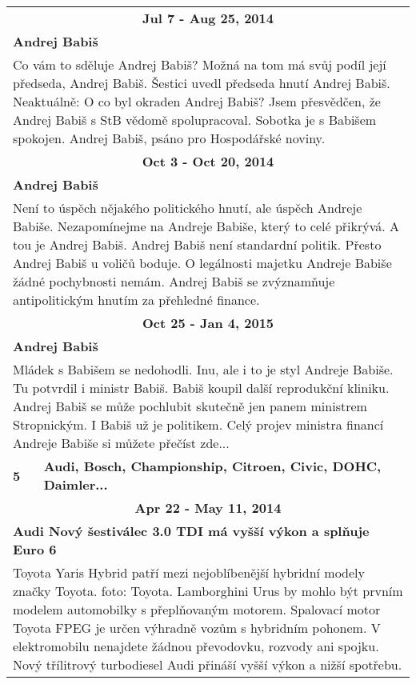 \begin{tabularx}{\linewidth}{l l}
                \multicolumn{2}{c}{\bf Jul 7 - Aug 25, 2014} \\
                \multicolumn{2}{p{\linewidth}}{\bf Andrej Babiš} \\
                \multicolumn{2}{p{\linewidth}}{Co vám to sděluje Andrej Babiš? Možná na tom má svůj podíl její předseda, Andrej Babiš. Šestici uvedl předseda hnutí Andrej Babiš. Neaktuálně: O co byl okraden Andrej Babiš? Jsem přesvědčen, že Andrej Babiš s StB vědomě spolupracoval. Sobotka je s Babišem spokojen. Andrej Babiš, psáno pro Hospodářské noviny.} \\ \midrule
                
                \multicolumn{2}{c}{\bf Oct 3 - Oct 20, 2014} \\
                \multicolumn{2}{p{\linewidth}}{\bf Andrej Babiš} \\
                \multicolumn{2}{p{\linewidth}}{Není to úspěch nějakého politického hnutí, ale úspěch Andreje Babiše. Nezapomínejme na Andreje Babiše, který to celé přikrývá. A tou je Andrej Babiš. Andrej Babiš není standardní politik. Přesto Andrej Babiš u voličů boduje. O legálnosti majetku Andreje Babiše žádné pochybnosti nemám. Andrej Babiš se zvýznamňuje antipolitickým hnutím za přehledné finance.} \\ \midrule
                
                \multicolumn{2}{c}{\bf Oct 25 - Jan 4, 2015} \\
                \multicolumn{2}{p{\linewidth}}{\bf Andrej Babiš} \\
                \multicolumn{2}{p{\linewidth}}{Mládek s Babišem se nedohodli. Inu, ale i to je styl Andreje Babiše. Tu potvrdil i ministr Babiš. Babiš koupil další reprodukční kliniku. Andrej Babiš se může pochlubit skutečně jen panem ministrem Stropnickým. I Babiš už je politikem. Celý projev ministra financí Andreje Babiše si můžete přečíst zde...} \\ \midrule
                [1.5pt]

            \bf 5 & \bf Audi, Bosch, Championship, Citroen, Civic, DOHC, Daimler... \\ \midrule
            
                \multicolumn{2}{c}{\bf Apr 22 - May 11, 2014} \\
                \multicolumn{2}{p{\linewidth}}{\bf Audi Nový šestiválec 3.0 TDI má vyšší výkon a splňuje Euro 6} \\
                \multicolumn{2}{p{\linewidth}}{Toyota Yaris Hybrid patří mezi nejoblíbenější hybridní modely značky Toyota. foto: Toyota. Lamborghini Urus by mohlo být prvním modelem automobilky s přeplňovaným motorem. Spalovací motor Toyota FPEG je určen výhradně vozům s hybridním pohonem. V elektromobilu nenajdete žádnou převodovku, rozvody ani spojku. Nový třílitrový turbodiesel Audi přináší vyšší výkon a nižší spotřebu.} \\ \midrule
                [1.5pt]


\end{tabularx}

